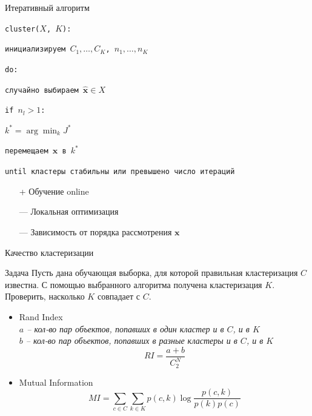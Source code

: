 \documentclass[10pt,a4paper]{beamer}
\begin{document}

\begin{frame}{Итеративный алгоритм}

\texttt{cluster($X$, $K$):}

\texttt{\quad инициализируем $C_1, \ldots, C_K$, $n_1, \ldots, n_K$}

\texttt{\quad do:}

\texttt{\quad\quad случайно выбираем $\hat{\mathbf{x}} \in X$}

\texttt{\quad\quad if $n_l > 1$:}

\texttt{\quad\quad\quad $k^* = \arg \min_k J^*$}

\texttt{\quad\quad\quad перемещаем $\hat{\mathbf{x}}$ в $k^*$}

\texttt{\quad until кластеры стабильны или превышено число итераций}

\vspace{1em}
\begin{itemize}
\item[+] Обучение online
\item[---] Локальная оптимизация
\item[---] Зависимость от порядка рассмотрения $\mathbf{x}$
\end{itemize}

\end{frame}


\begin{frame}{Качество кластеризации}

\begin{block}{Задача}
Пусть дана обучающая выборка, для которой правильная кластеризация $C$ известна. С помощью выбранного алгоритма получена кластеризация $K$. Проверить, насколько $K$ совпадает с $C$.
\end{block}

\begin{itemize}
\item Rand Index \\
{\it \small
$a$ -- кол-во пар объектов, попавших в один кластер и в $C$, и в $K$ \\
$b$ -- кол-во пар объектов, попавших в разные кластеры и в $C$, и в $K$
\[
RI = \frac{a+b}{C^N_2}
\]
}
\item Mutual Information \\
{\it \small
\[
MI = \sum_{c \in C} \sum_{k \in K} p(c, k) \log \frac{p(c, k)}{p(k)p(c)}
\]
}
\end{itemize}


\end{frame}
\end{document}
